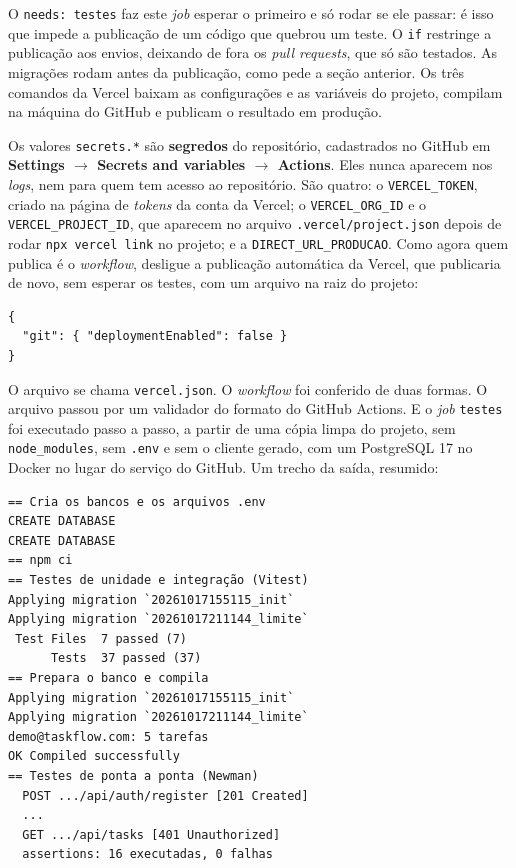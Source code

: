 O \texttt{needs: testes} faz este \textit{job} esperar o primeiro e só rodar se ele passar: é isso que impede a publicação de um código que quebrou um teste. O \texttt{if} restringe a publicação aos envios, deixando de fora os \textit{pull requests}, que só são testados. As migrações rodam antes da publicação, como pede a seção anterior. Os três comandos da Vercel baixam as configurações e as variáveis do projeto, compilam na máquina do GitHub e publicam o resultado em produção.

Os valores \texttt{secrets.*} são \textbf{segredos} do repositório, cadastrados no GitHub em \textbf{Settings $\rightarrow$ Secrets and variables $\rightarrow$ Actions}. Eles nunca aparecem nos \textit{logs}, nem para quem tem acesso ao repositório. São quatro: o \texttt{VERCEL\_TOKEN}, criado na página de \textit{tokens} da conta da Vercel; o \texttt{VERCEL\_ORG\_ID} e o \texttt{VERCEL\_PROJECT\_ID}, que aparecem no arquivo \texttt{.vercel/project.json} depois de rodar \texttt{npx vercel link} no projeto; e a \texttt{DIRECT\_URL\_PRODUCAO}. Como agora quem publica é o \textit{workflow}, desligue a publicação automática da Vercel, que publicaria de novo, sem esperar os testes, com um arquivo na raiz do projeto:

\begin{codigo}
\begin{Verbatim}[breaklines=true, breaksymbolleft={}, fontsize=\footnotesize]
{
  "git": { "deploymentEnabled": false }
}
\end{Verbatim}
\end{codigo}

O arquivo se chama \texttt{vercel.json}. O \textit{workflow} foi conferido de duas formas. O arquivo passou por um validador do formato do GitHub Actions. E o \textit{job} \texttt{testes} foi executado passo a passo, a partir de uma cópia limpa do projeto, sem \texttt{node\_modules}, sem \texttt{.env} e sem o cliente gerado, com um PostgreSQL 17 no Docker no lugar do serviço do GitHub. Um trecho da saída, resumido:

\begin{codigo}
\begin{Verbatim}[breaklines=true, breaksymbolleft={}, fontsize=\footnotesize]
== Cria os bancos e os arquivos .env
CREATE DATABASE
CREATE DATABASE
== npm ci
== Testes de unidade e integração (Vitest)
Applying migration `20261017155115_init`
Applying migration `20261017211144_limite`
 Test Files  7 passed (7)
      Tests  37 passed (37)
== Prepara o banco e compila
Applying migration `20261017155115_init`
Applying migration `20261017211144_limite`
demo@taskflow.com: 5 tarefas
OK Compiled successfully
== Testes de ponta a ponta (Newman)
  POST .../api/auth/register [201 Created]
  ...
  GET .../api/tasks [401 Unauthorized]
  assertions: 16 executadas, 0 falhas
\end{Verbatim}
\end{codigo}

